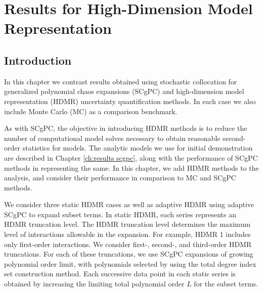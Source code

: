 
\chapter{Results for High-Dimension Model Representation} %

\label{ch:results hdmr} %



\section{Introduction}
In this chapter we contrast results obtained using stochastic collocation for generalized polynomial chaos
expansions (SCgPC) and high-dimension model representation (HDMR) uncertainty quantification methods.  In each case
we also include Monte Carlo (MC) as a comparison benchmark.

As with SCgPC, the objective in introducing HDMR methods is to reduce the number of computational model solves
necessary to obtain reasonable second-order statistics for models.  The analytic models we use for initial
demonstration are described in Chapter \ref{ch:results scgpc}, along with the performance of SCgPC methods in
representing the same.  In this chapter, we add HDMR methods to the analysis, and consider their performance
in comparison to MC and SCgPC methods.

We consider three static HDMR cases as well as adaptive HDMR using adaptive SCgPC to expand subset terms.  In
static HDMR, each series represents an HDMR truncation level.  The HDMR truncation level determines the
maximum level of interactions allowable in the expansion.  For example, HDMR 1 includes only first-order
interactions.  We consider first-, second-, and third-order HDMR truncations.  For each of these truncations,
we use SCgPC expansions of growing polynomial order limit, with polynomials selected by using the total degree
index set construction method.  Each successive data point in each static series is obtained by increasing the
limiting total polynomial order $L$ for the subset terms.


